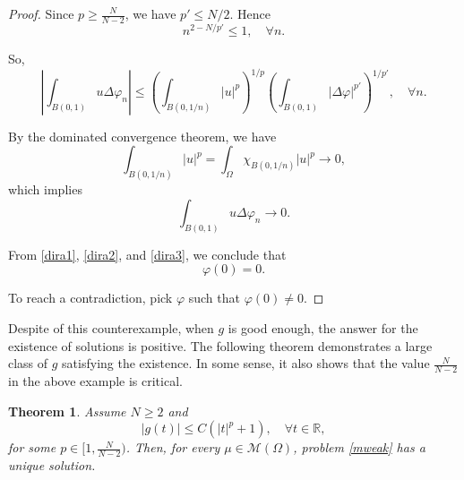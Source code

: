 \documentclass[a4paper, 11pt]{report}
\newtheorem{thm}{Theorem}[chapter]
\theoremstyle{definition}\newtheorem*{rmk}{Remark}
\begin{document}
\begin{proof}
Since $p \ge \frac{N}{N-2}$, we have $p' \le N/2$. Hence
\[
n^{2-N/p'} \le 1,\quad \forall n.
\]

So,
\[
\left|\int_{B(0,1)} u\Delta \varphi_n\right| \le \left(\int_{B(0,1/n)} |u|^p\right)^{1/p}\left(\int_{B(0,1)} |\Delta\varphi|^{p'}\right) ^{1/p'},\quad\forall n.
\]

By the dominated convergence theorem, we have
\[
\int_{B(0,1/n)} |u|^p = \int_{\Omega}\chi_{B(0,1/n)}|u|^p \to 0,
\]
which implies
\begin{equation}\label{dira3}
\int_{B(0,1)} u\Delta \varphi_n \to 0.
\end{equation}

From \eqref{dira1}, \eqref{dira2}, and \eqref{dira3}, we conclude that
\[
\varphi(0) = 0.
\]

To reach a contradiction, pick $\varphi$ such that $\varphi(0) \neq 0$.
\end{proof} 

Despite of this counterexample, when $g$ is good enough, the answer for the existence of solutions is positive. The following theorem demonstrates a large class of $g$ satisfying the existence. In some sense, it also shows that the value $\frac{N}{N-2}$ in the above example is critical.

\begin{thm}
Assume $N \ge 2$ and
\[
|g(t)| \le C(|t|^p + 1), \quad\forall t\in \mathbb{R},
\]
for some $p \in [1, \frac{N}{N-2})$. Then, for every $\mu\in \mathcal{M}(\Omega)$, problem \eqref{mweak} has a unique solution.
\end{thm}
\end{document}
